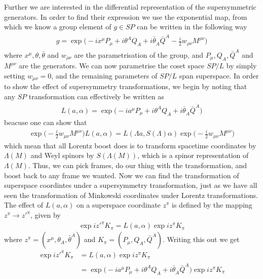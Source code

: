 Further we are interested in the differential representation of the supersymmetric generators. In order to find their expression we use the exponential map, from which we know a group element of $g\in SP$ can be written in the following way
\begin{align}
    g=\exp\big(-ix^{\mu}P_{\mu}+i\theta^{A}Q_{A}+i\bar{\theta}_{\dot{A}}\bar{Q}^{\dot{A}}-\frac{i}{2}w_{\rho\nu}M^{\rho\nu}\big)
\end{align}
where $x^{\mu}, \theta, \bar{\theta}$ and $w_{\rho\nu}$ are the parametrisation of the group, and $P_{\mu},Q_{A},\bar{Q}^{\dot{A}}$ and $M^{\rho\nu}$ are the generators. We can now parametrise the coset space $SP/L$ by simply setting $w_{\mu\nu}=0$, and the remaining parameters of $SP/L$ span superspace. In order to show the effect of supersymmetry transformations, we begin by noting that any $SP$ transformation can effectively be written as
\begin{align*}
    L(a,\alpha)=\exp\big(-ia^{\mu}P_{\mu}+i\theta^{A}Q_{A}+i\bar{\theta}_{\dot{A}}\bar{Q}^{\dot{A}}\big)
\end{align*}
beacuse one can show that
\begin{align*}
    \exp\big(-\frac{i}{2}w_{\mu\nu}M^{\mu\nu}\big)L(a,\alpha)=L(\Lambda a,S(\Lambda)\alpha)\exp\big(-\frac{i}{2}w_{\mu\nu}M^{\mu\nu}\big)
\end{align*}
which mean that all Lorentz boost does is to transform spacetime coordinates by $\Lambda(M)$ and Weyl spinors by $S(\Lambda(M))$, which is a spinor representation of $\Lambda(M)$. Thus, we can pick frames, do our thing with the transformation, and boost back to any frame we wanted. Now we can find the transformation of superspace coordintes under a supersymmetry transformation, just as we have all seen the transformation of Minkowski coordinates under Lorentz transformations. The effect of $L(a,\alpha)$ on a superspace coordinate $z^{\pi}$ is defined by the mapping $z^{\pi}\rightarrow z'^{\pi}$, given by
\begin{align*}
    \exp{iz'^{\pi}K_{\pi}}=L(a,\alpha)\exp{iz^{\pi}K_{\pi}}
\end{align*}
where $z^{\pi}=(x^{\mu},\theta_{A},\bar{\theta}^{\dot{A}})$ and $K_{\pi}=(P_{\mu},Q_{A},\bar{Q}^{\dot{A}})$. Writing this out we get
\begin{align*}
    \exp{iz'^{\pi}K_{\pi}}&=L(a,\alpha)\exp{iz^{\pi}K_{\pi}}
    \\
    &=\exp\big(-ia^{\mu}P_{\mu}+i\theta^{A}Q_{A}+i\bar{\theta}_{\dot{A}}\bar{Q}^{\dot{A}}\big)\exp{iz^{\pi}K_{\pi}}
\end{align*}

